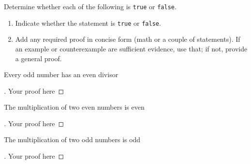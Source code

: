 \documentclass[12pt]{article}
\newenvironment{exercise}[2][Exercise]{\begin{trivlist}
\item[\hskip \labelsep {\bfseries #1}\hskip \labelsep {\bfseries #2.}]}{\end{trivlist}}
\newenvironment{solution}[1][{\color{red} Solution:}]{\begin{trivlist}
\item[\hskip \labelsep {\bfseries #1}\hskip \labelsep {\bfseries}]}{\end{trivlist}}
\begin{document}
\clearpage

\begin{exercise}{2}

Determine whether each of the following is \texttt{true} or \texttt{false}. 

\begin{tip}
\begin{enumerate}
    \item Indicate whether the statement is \texttt{true} or \texttt{false}.
    \item Add any required proof in concise form (math or a couple of statements). If an example or counterexample are sufficient evidence, use that; if not, provide a general proof.
\end{enumerate}
\end{tip}

\begin{enumerate}[(a)]
	\item Every odd number has an even divisor
    \begin{solution} 
        \begin{proof}[\unskip\nopunct]
            Your proof here
        \end{proof}
    \end{solution}

    \item The multiplication of two even numbers is even
    \begin{solution} 
        \begin{proof}[\unskip\nopunct]
            Your proof here
        \end{proof}
    \end{solution}    
        
	\item The multiplication of two odd numbers is odd
    \begin{solution} 
        \begin{proof}[\unskip\nopunct]
            Your proof here
        \end{proof}
    \end{solution}

    
    
	\end{enumerate}
\end{exercise}
\end{document}
